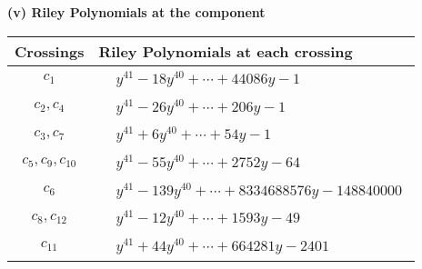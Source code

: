 \documentclass[1p]{elsarticle_modified}
\theoremstyle{definition}
\begin{document}
\flushleft \textbf{(v) Riley Polynomials at the component}\newline \\
\begin{tabular}{m{50pt}|m{274pt}}
Crossings & \hspace{64pt}Riley Polynomials at each crossing \\
\hline $$\begin{aligned}c_{1}\end{aligned}$$&$\begin{aligned}
&y^{41}-18 y^{40}+\cdots+44086 y-1
\end{aligned}$\\
\hline $$\begin{aligned}c_{2},c_{4}\end{aligned}$$&$\begin{aligned}
&y^{41}-26 y^{40}+\cdots+206 y-1
\end{aligned}$\\
\hline $$\begin{aligned}c_{3},c_{7}\end{aligned}$$&$\begin{aligned}
&y^{41}+6 y^{40}+\cdots+54 y-1
\end{aligned}$\\
\hline $$\begin{aligned}c_{5},c_{9},c_{10}\end{aligned}$$&$\begin{aligned}
&y^{41}-55 y^{40}+\cdots+2752 y-64
\end{aligned}$\\
\hline $$\begin{aligned}c_{6}\end{aligned}$$&$\begin{aligned}
&y^{41}-139 y^{40}+\cdots+8334688576 y-148840000
\end{aligned}$\\
\hline $$\begin{aligned}c_{8},c_{12}\end{aligned}$$&$\begin{aligned}
&y^{41}-12 y^{40}+\cdots+1593 y-49
\end{aligned}$\\
\hline $$\begin{aligned}c_{11}\end{aligned}$$&$\begin{aligned}
&y^{41}+44 y^{40}+\cdots+664281 y-2401
\end{aligned}$\\
\hline
\end{tabular}\\~\\
\end{document}

